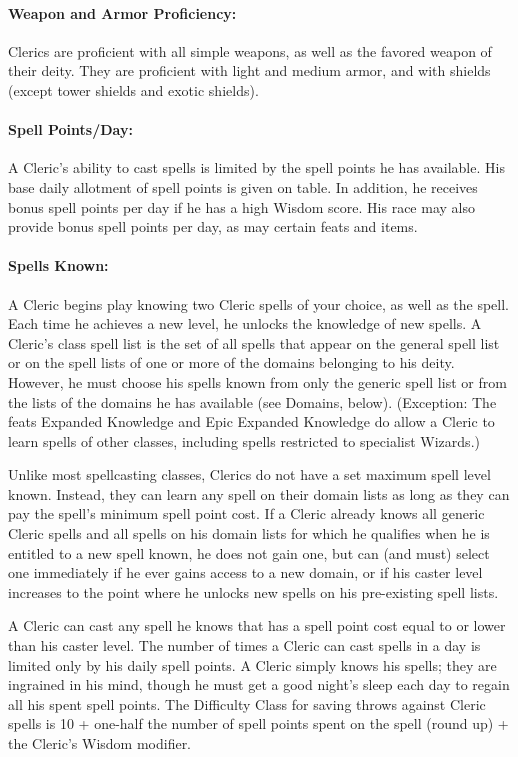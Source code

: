 \paragraph{Weapon and Armor Proficiency:} 
Clerics are proficient with all simple weapons, as well as the favored weapon of their deity.
They are proficient with light and medium armor, and with shields (except tower shields and exotic shields).

\paragraph{Spell Points/Day:} 
A Cleric's ability to cast spells is limited by the spell points he has available. 
His base daily allotment of spell points is given on  table. 
In addition, he receives bonus spell points per day if he has a high Wisdom score.
His race may also provide bonus spell points per day, as may certain feats and items.

\paragraph{Spells Known:} A Cleric begins play knowing two Cleric spells of your choice, 
as well as the  spell. 
Each time he achieves a new level, he unlocks the knowledge of new spells.
A Cleric's class spell list is the set of all spells that appear on the general  spell list or on the spell lists of one or more of the domains belonging to his deity. However, he must choose his spells known from only the generic spell list or from the lists of the domains he has available (see Domains, below).
(Exception: The feats Expanded Knowledge and Epic Expanded Knowledge do allow a Cleric to learn spells of other classes, 
including spells restricted to specialist Wizards.) 

Unlike most spellcasting classes, Clerics do not have a set maximum spell level known.
Instead, they can learn any spell on their domain lists as long as they can pay the spell's minimum spell point cost.
If a Cleric already knows all generic Cleric spells and all spells on his domain lists for which he qualifies when he is entitled to a new spell known, he does not gain one, but can (and must) select one immediately if he ever gains access to a new domain, or if his caster level increases to the point where he unlocks new spells on his pre-existing spell lists.

A Cleric can cast any spell he knows that has a spell point cost equal to or lower than his caster level.
The number of times a Cleric can cast spells in a day is limited only by his daily spell points. 
A Cleric simply knows his spells; they are ingrained in his mind, though he must get a good night's sleep each day to regain all his spent spell points.
The Difficulty Class for saving throws against Cleric spells is 10 + one-half the number of spell points spent on the spell (round up) + the Cleric's Wisdom modifier. 

